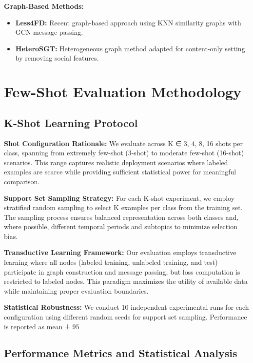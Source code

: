 \textbf{Graph-Based Methods:}
\begin{itemize}
\item \textbf{Less4FD:} Recent graph-based approach using KNN similarity graphs with GCN message passing.

\item \textbf{HeteroSGT:} Heterogeneous graph method adapted for content-only setting by removing social features.
\end{itemize}

\section{Few-Shot Evaluation Methodology}

\subsection{K-Shot Learning Protocol}

\textbf{Shot Configuration Rationale:} We evaluate across K ∈ {3, 4, 8, 16} shots per class, spanning from extremely few-shot (3-shot) to moderate few-shot (16-shot) scenarios. This range captures realistic deployment scenarios where labeled examples are scarce while providing sufficient statistical power for meaningful comparison.

\textbf{Support Set Sampling Strategy:} For each K-shot experiment, we employ stratified random sampling to select K examples per class from the training set. The sampling process ensures balanced representation across both classes and, where possible, different temporal periods and subtopics to minimize selection bias.

\textbf{Transductive Learning Framework:} Our evaluation employs transductive learning where all nodes (labeled training, unlabeled training, and test) participate in graph construction and message passing, but loss computation is restricted to labeled nodes. This paradigm maximizes the utility of available data while maintaining proper evaluation boundaries.

\textbf{Statistical Robustness:} We conduct 10 independent experimental runs for each configuration using different random seeds for support set sampling. Performance is reported as mean ± 95%

\subsection{Performance Metrics and Statistical Analysis}

